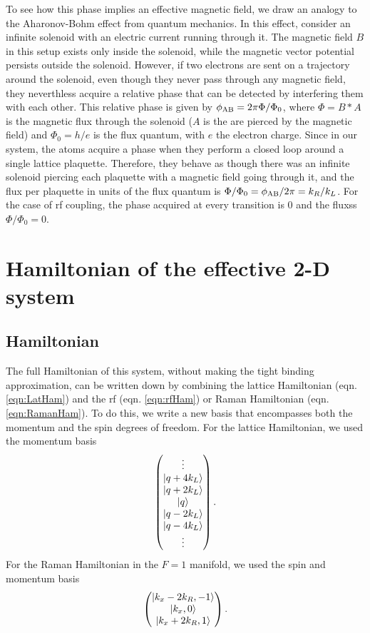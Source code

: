 To see how this phase implies an effective magnetic field, we draw an analogy to the Aharonov-Bohm effect\cite{Aharonov1959, Aharonov1992} from quantum mechanics. In this effect, consider an infinite solenoid with an electric current running through it. The magnetic field $B$ in this setup exists only inside the solenoid, while the magnetic vector potential persists outside the solenoid.  However, if two electrons are sent on a trajectory around the solenoid, even though they never pass through any magnetic field, they neverthless acquire a relative phase that can be detected by interfering them with each other. This relative phase is given by $\phi_{\rm AB} =2 \pi \Phi/\Phi_0$, where $\Phi = B*A$ is the magnetic flux through the solenoid ($A$ is the are pierced by the magnetic field) and $\Phi_0=h/e$ is the flux quantum, with $e$ the electron charge. Since in our system, the atoms acquire a phase when they perform a closed loop around a single lattice plaquette. Therefore, they behave as though there was an infinite solenoid piercing each plaquette with a magnetic field going through it, and the flux per plaquette in units of the flux quantum is $\Phi/\Phi_0=\phi_{\rm AB}/2\pi =  k_R/k_L$. For the case of rf coupling, the phase acquired at every transition is $0$ and the fluxss $\Phi/\Phi_0=0$.

\section{Hamiltonian of the effective 2-D system}

\subsection{Hamiltonian}\label{sec:SynDimHamiltonian}
The full Hamiltonian of this system, without making the tight binding approximation, can be written down by combining the lattice Hamiltonian (eqn. \ref{eqn:LatHam}) and the rf (eqn. \ref{eqn:rfHam}) or Raman Hamiltonian (eqn. \ref{eqn:RamanHam}). To do this, we write a new basis that encompasses both the momentum and the spin degrees of freedom. For the lattice Hamiltonian, we used the momentum basis
\begin{equation}
 \begin{pmatrix} \vdots \\
\mathinner{|{q+4 k_L}\rangle}\\
\mathinner{|{q+2 k_L}\rangle}\\
\mathinner{|{q}\rangle}\\
\mathinner{|{q -2 k_L}\rangle}\\
\mathinner{|{q - 4 k_L}\rangle}\\
\vdots
\end{pmatrix} \\.
\end{equation}
For the Raman Hamiltonian in the $F=1$ manifold, we used the spin and momentum basis
\begin{equation}
\begin{pmatrix}
\mathinner{|{k_x-2k_R,-1}\rangle}\\
 \mathinner{|{k_x,0}\rangle}\\
\mathinner{|{k_x+2k_R,1}\rangle}
\end{pmatrix}\\.
\end{equation}

